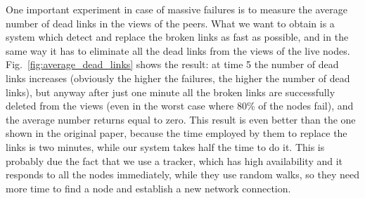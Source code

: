 One important experiment in case of massive failures is to measure the average number of dead links in the views of the peers. What we want to obtain is a system which detect and replace the broken links as fast as possible, and in the same way it has to eliminate all the dead links from the views of the live nodes. Fig.~\ref{fig:average_dead_links} shows the result: at time 5 the number of dead links increases (obviously the higher the failures, the higher the number of dead links), but anyway after just one minute all the broken links are successfully deleted from the views (even in the worst case where 80\% of the nodes fail), and the average number returns equal to zero. This result is even better than the one shown in the original paper, because the time employed by them to replace the links is two minutes, while our system takes half the time to do it. This is probably due the fact that we use a tracker, which has high availability and it responds to all the nodes immediately, while they use random walks, so they need more time to find a node and establish a new network connection.

